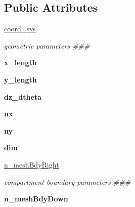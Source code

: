 \subsection*{Public Attributes}
\begin{DoxyCompactItemize}
\item 
\hyperlink{classcomp_1_1Comp_ae00e132d485d50acaf13977284fd9051}{coord\+\_\+sys}\hypertarget{classcomp_1_1Comp_ae00e132d485d50acaf13977284fd9051}{}\label{classcomp_1_1Comp_ae00e132d485d50acaf13977284fd9051}

\begin{DoxyCompactList}\small\item\em geometric parameters \#\#\# \end{DoxyCompactList}\item 
{\bfseries x\+\_\+length}\hypertarget{classcomp_1_1Comp_ab00f0017e7b9e2a1358d200872bc5d45}{}\label{classcomp_1_1Comp_ab00f0017e7b9e2a1358d200872bc5d45}

\item 
{\bfseries y\+\_\+length}\hypertarget{classcomp_1_1Comp_a238a265e564e002cb32f816e588fedda}{}\label{classcomp_1_1Comp_a238a265e564e002cb32f816e588fedda}

\item 
{\bfseries dz\+\_\+dtheta}\hypertarget{classcomp_1_1Comp_a46b24a2ad70c60858be5970dd249e42f}{}\label{classcomp_1_1Comp_a46b24a2ad70c60858be5970dd249e42f}

\item 
{\bfseries nx}\hypertarget{classcomp_1_1Comp_aa57c2e18312b3ff75ca85e5b91630c1e}{}\label{classcomp_1_1Comp_aa57c2e18312b3ff75ca85e5b91630c1e}

\item 
{\bfseries ny}\hypertarget{classcomp_1_1Comp_ac88e268c8aa6dc536ec4d91ced077193}{}\label{classcomp_1_1Comp_ac88e268c8aa6dc536ec4d91ced077193}

\item 
{\bfseries dim}\hypertarget{classcomp_1_1Comp_a5ad617a643f9f0b33d82cb7c774409d3}{}\label{classcomp_1_1Comp_a5ad617a643f9f0b33d82cb7c774409d3}

\item 
\hyperlink{classcomp_1_1Comp_a3a618fb7afb0d89e902b18620f194cbb}{n\+\_\+mesh\+Bdy\+Right}\hypertarget{classcomp_1_1Comp_a3a618fb7afb0d89e902b18620f194cbb}{}\label{classcomp_1_1Comp_a3a618fb7afb0d89e902b18620f194cbb}

\begin{DoxyCompactList}\small\item\em compartment boundary parameters \#\#\# \end{DoxyCompactList}\item 
{\bfseries n\+\_\+mesh\+Bdy\+Down}\hypertarget{classcomp_1_1Comp_a9252858541b296d523e5a44d68f9cedf}{}\label{classcomp_1_1Comp_a9252858541b296d523e5a44d68f9cedf}


\end{DoxyCompactItemize}
